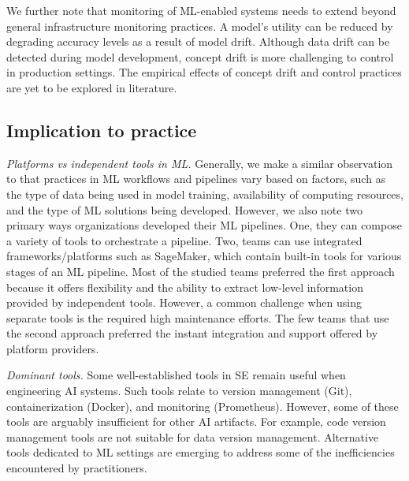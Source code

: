 We further note that monitoring of ML-enabled systems needs to extend beyond general infrastructure monitoring practices. A model's utility can be reduced by degrading accuracy levels as a result of model drift. Although data drift can be detected during model development, concept drift is more challenging to control in production settings. The empirical effects of concept drift and control practices are yet to be explored in literature.


\subsection{Implication to practice}
\textit{Platforms vs independent tools in ML.} Generally, we make a similar observation to \cite{Doris2021MLPipelines} that practices in ML workflows and pipelines vary based on factors, such as the type of data being used in model training, availability of computing resources, and the type of ML solutions being developed. However, we also note two primary ways organizations developed their ML pipelines. One, they can compose a variety of tools to orchestrate a pipeline. Two, teams can use integrated frameworks/platforms such as SageMaker, which contain built-in tools for various stages of an ML pipeline. Most of the studied teams preferred the first approach because it offers flexibility and the ability to extract low-level information provided by independent tools. However, a common challenge when using separate tools is the required high maintenance efforts. The few teams that use the second approach preferred the instant integration and support offered by platform providers.

\textit{Dominant tools.} Some well-established tools in SE remain useful when engineering AI systems. Such tools relate to version management (Git), containerization (Docker), and monitoring (Prometheus). However, some of these tools are arguably insufficient for other AI artifacts. For example, code version management tools are not suitable for data version management. Alternative tools dedicated to ML settings are emerging to address some of the inefficiencies encountered by practitioners. %

